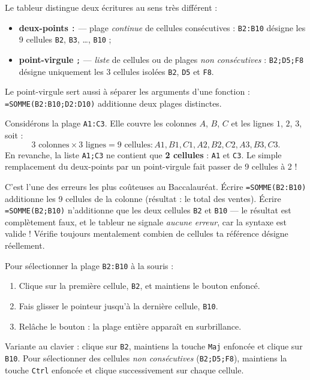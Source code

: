 \documentclass[11pt]{article}
\begin{document}
\begin{propriete}
Le tableur distingue deux écritures au sens très différent :
\begin{itemize}
\item \textbf{deux-points} \texttt{:} — plage \emph{continue} de cellules consécutives : \texttt{B2:B10} désigne les 9 cellules \texttt{B2}, \texttt{B3}, \ldots, \texttt{B10} ;
\item \textbf{point-virgule} \texttt{;} — \emph{liste} de cellules ou de plages \emph{non consécutives} : \texttt{B2;D5;F8} désigne uniquement les 3 cellules isolées \texttt{B2}, \texttt{D5} et \texttt{F8}.
\end{itemize}
Le point-virgule sert aussi à séparer les arguments d'une fonction : \texttt{=SOMME(B2:B10;D2:D10)} additionne deux plages distinctes.
\end{propriete}

\begin{exemplebox}
Considérons la plage \texttt{A1:C3}. Elle couvre les colonnes $A$, $B$, $C$ et les lignes $1$, $2$, $3$, soit :
\[ 3 \text{ colonnes} \times 3 \text{ lignes} = 9 \text{ cellules} : A1, B1, C1, A2, B2, C2, A3, B3, C3. \]
En revanche, la liste \texttt{A1;C3} ne contient que \textbf{2 cellules} : \texttt{A1} et \texttt{C3}. Le simple remplacement du deux-points par un point-virgule fait passer de 9 cellules à 2 !
\end{exemplebox}

\begin{attention}
C'est l'une des erreurs les plus coûteuses au Baccalauréat. Écrire \texttt{=SOMME(B2:B10)} additionne les 9 cellules de la colonne (résultat : le total des ventes). Écrire \texttt{=SOMME(B2;B10)} n'additionne que les deux cellules \texttt{B2} et \texttt{B10} — le résultat est complètement faux, et le tableur ne signale \emph{aucune erreur}, car la syntaxe est valide ! Vérifie toujours mentalement combien de cellules ta référence désigne réellement.
\end{attention}

\begin{methode}
Pour sélectionner la plage \texttt{B2:B10} à la souris :
\begin{enumerate}
\item Clique sur la première cellule, \texttt{B2}, et maintiens le bouton enfoncé.
\item Fais glisser le pointeur jusqu'à la dernière cellule, \texttt{B10}.
\item Relâche le bouton : la plage entière apparaît en surbrillance.
\end{enumerate}
Variante au clavier : clique sur \texttt{B2}, maintiens la touche \texttt{Maj} enfoncée et clique sur \texttt{B10}. Pour sélectionner des cellules \emph{non consécutives} (\texttt{B2;D5;F8}), maintiens la touche \texttt{Ctrl} enfoncée et clique successivement sur chaque cellule.
\end{methode}
\end{document}
